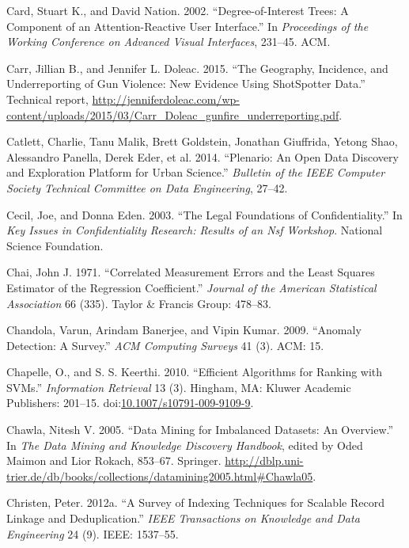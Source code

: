 \documentclass[]{krantz}
\begin{document}
\hypertarget{ref-card2002degree}{}
Card, Stuart K., and David Nation. 2002. ``Degree-of-Interest Trees: A
Component of an Attention-Reactive User Interface.'' In
\emph{Proceedings of the Working Conference on Advanced Visual
Interfaces}, 231--45. ACM.

\hypertarget{ref-carr2015geography}{}
Carr, Jillian B., and Jennifer L. Doleac. 2015. ``The Geography,
Incidence, and Underreporting of Gun Violence: New Evidence Using
ShotSpotter Data.'' Technical report,
\url{http://jenniferdoleac.com/wp-content/uploads/2015/03/Carr_Doleac_gunfire_underreporting.pdf}.

\hypertarget{ref-plenario}{}
Catlett, Charlie, Tanu Malik, Brett Goldstein, Jonathan Giuffrida,
Yetong Shao, Alessandro Panella, Derek Eder, et al. 2014. ``Plenario: An
Open Data Discovery and Exploration Platform for Urban Science.''
\emph{Bulletin of the IEEE Computer Society Technical Committee on Data
Engineering}, 27--42.

\hypertarget{ref-Cecil2003}{}
Cecil, Joe, and Donna Eden. 2003. ``The Legal Foundations of
Confidentiality.'' In \emph{Key Issues in Confidentiality Research:
Results of an Nsf Workshop}. National Science Foundation.

\hypertarget{ref-chai1971correlated}{}
Chai, John J. 1971. ``Correlated Measurement Errors and the Least
Squares Estimator of the Regression Coefficient.'' \emph{Journal of the
American Statistical Association} 66 (335). Taylor \& Francis Group:
478--83.

\hypertarget{ref-chandola2009anomaly}{}
Chandola, Varun, Arindam Banerjee, and Vipin Kumar. 2009. ``Anomaly
Detection: A Survey.'' \emph{ACM Computing Surveys} 41 (3). ACM: 15.

\hypertarget{ref-Chapelle2010}{}
Chapelle, O., and S. S. Keerthi. 2010. ``Efficient Algorithms for
Ranking with SVMs.'' \emph{Information Retrieval} 13 (3). Hingham, MA:
Kluwer Academic Publishers: 201--15.
doi:\href{https://doi.org/10.1007/s10791-009-9109-9}{10.1007/s10791-009-9109-9}.

\hypertarget{ref-Chawla05}{}
Chawla, Nitesh V. 2005. ``Data Mining for Imbalanced Datasets: An
Overview.'' In \emph{The Data Mining and Knowledge Discovery Handbook},
edited by Oded Maimon and Lior Rokach, 853--67. Springer.
\url{http://dblp.uni-trier.de/db/books/collections/datamining2005.html\#Chawla05}.

\hypertarget{ref-christen2012survey}{}
Christen, Peter. 2012a. ``A Survey of Indexing Techniques for Scalable
Record Linkage and Deduplication.'' \emph{IEEE Transactions on Knowledge
and Data Engineering} 24 (9). IEEE: 1537--55.
\end{document}
